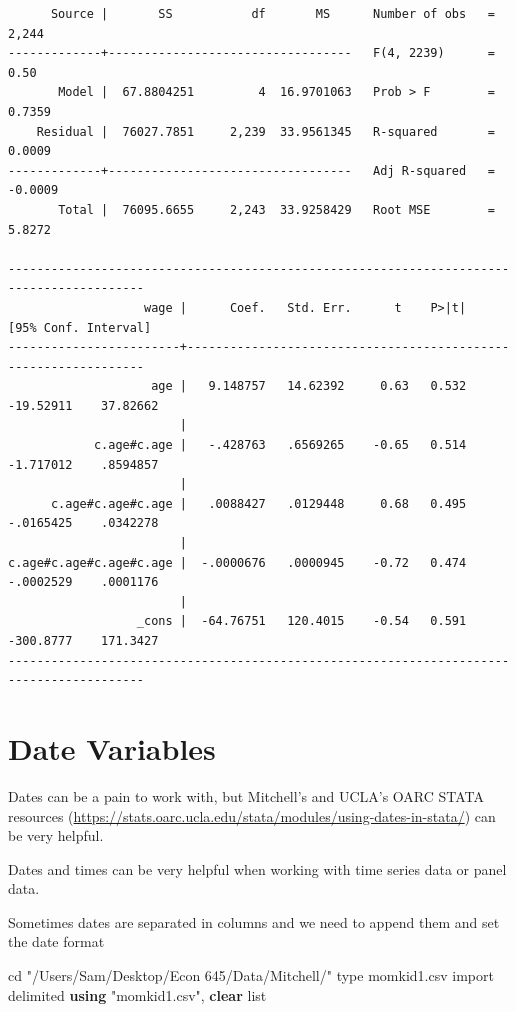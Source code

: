 \documentclass[
]{book}
\newenvironment{Shaded}{\begin{snugshade}}{\end{snugshade}}
\newcommand{\DecValTok}[1]{\textcolor[rgb]{0.00,0.00,0.81}{#1}}
\newcommand{\KeywordTok}[1]{\textcolor[rgb]{0.13,0.29,0.53}{\textbf{#1}}}
\newcommand{\NormalTok}[1]{#1}
\newcommand{\OtherTok}[1]{\textcolor[rgb]{0.56,0.35,0.01}{#1}}
\newcommand{\StringTok}[1]{\textcolor[rgb]{0.31,0.60,0.02}{#1}}
\begin{document}
\begin{verbatim}
      Source |       SS           df       MS      Number of obs   =     2,244
-------------+----------------------------------   F(4, 2239)      =      0.50
       Model |  67.8804251         4  16.9701063   Prob > F        =    0.7359
    Residual |  76027.7851     2,239  33.9561345   R-squared       =    0.0009
-------------+----------------------------------   Adj R-squared   =   -0.0009
       Total |  76095.6655     2,243  33.9258429   Root MSE        =    5.8272

-----------------------------------------------------------------------------------------
                   wage |      Coef.   Std. Err.      t    P>|t|     [95% Conf. Interval]
------------------------+----------------------------------------------------------------
                    age |   9.148757   14.62392     0.63   0.532    -19.52911    37.82662
                        |
            c.age#c.age |   -.428763   .6569265    -0.65   0.514    -1.717012    .8594857
                        |
      c.age#c.age#c.age |   .0088427   .0129448     0.68   0.495    -.0165425    .0342278
                        |
c.age#c.age#c.age#c.age |  -.0000676   .0000945    -0.72   0.474    -.0002529    .0001176
                        |
                  _cons |  -64.76751   120.4015    -0.54   0.591    -300.8777    171.3427
-----------------------------------------------------------------------------------------
\end{verbatim}

\section{Date Variables}\label{date-variables}

Dates can be a pain to work with, but Mitchell's and UCLA's OARC STATA resources (\url{https://stats.oarc.ucla.edu/stata/modules/using-dates-in-stata/}) can be very helpful.

Dates and times can be very helpful when working with time series data or panel data.

Sometimes dates are separated in columns and we need to append them and set the date format

\begin{Shaded}
\begin{Highlighting}[]
\NormalTok{cd }\StringTok{"/Users/Sam/Desktop/Econ 645/Data/Mitchell/"}
\DecValTok{type}\NormalTok{ momkid1.csv}
\NormalTok{import delimited }\KeywordTok{using} \StringTok{"momkid1.csv"}\NormalTok{, }\KeywordTok{clear}
\OtherTok{list}
\end{Highlighting}
\end{Shaded}
\end{document}
